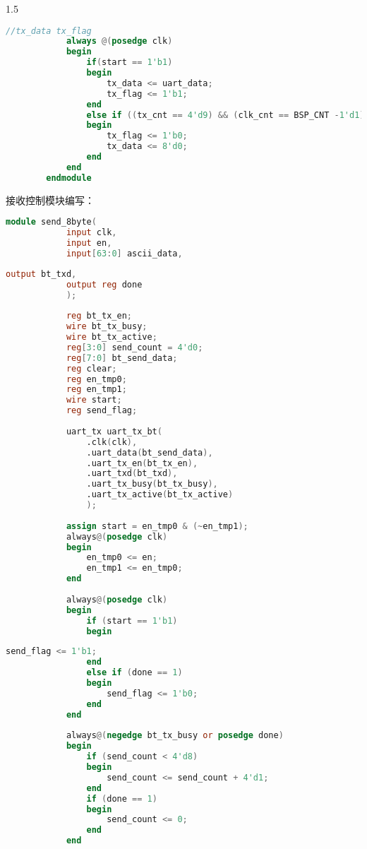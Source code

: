 {\begin{spacing}{1.5}
\begin{lstlisting}[language=Verilog]
			//tx_data tx_flag 
			always @(posedge clk)
			begin 
				if(start == 1'b1)
				begin 
					tx_data <= uart_data; 
					tx_flag <= 1'b1; 
				end 
				else if ((tx_cnt == 4'd9) && (clk_cnt == BSP_CNT -1'd1))
				begin 
					tx_flag <= 1'b0; 
					tx_data <= 8'd0; 
				end 
			end
		endmodule
		\end{lstlisting}

		接收控制模块编写：

		\begin{lstlisting}[language=Verilog]
		module send_8byte(
			input clk,
			input en,
			input[63:0] ascii_data,
		\end{lstlisting}
		\begin{lstlisting}[language=Verilog]
			output bt_txd,
			output reg done
			);
		
			reg bt_tx_en;
			wire bt_tx_busy;
			wire bt_tx_active;
			reg[3:0] send_count = 4'd0;
			reg[7:0] bt_send_data;
			reg clear;
			reg en_tmp0;
			reg en_tmp1;
			wire start;
			reg send_flag;
		
			uart_tx uart_tx_bt(
				.clk(clk),
				.uart_data(bt_send_data),
				.uart_tx_en(bt_tx_en),
				.uart_txd(bt_txd),
				.uart_tx_busy(bt_tx_busy),
				.uart_tx_active(bt_tx_active)
				);
		
			assign start = en_tmp0 & (~en_tmp1);
			always@(posedge clk)
			begin
				en_tmp0 <= en; 
				en_tmp1 <= en_tmp0; 
			end
		
			always@(posedge clk)
			begin
				if (start == 1'b1)
				begin
		\end{lstlisting}
		\begin{lstlisting}[language=Verilog]
					send_flag <= 1'b1;
				end
				else if (done == 1)
				begin
					send_flag <= 1'b0;
				end
			end
		
			always@(negedge bt_tx_busy or posedge done)
			begin
				if (send_count < 4'd8)
				begin
					send_count <= send_count + 4'd1;
				end
				if (done == 1)
				begin
					send_count <= 0;
				end
			end
		

\end{lstlisting}
\end{spacing}}
